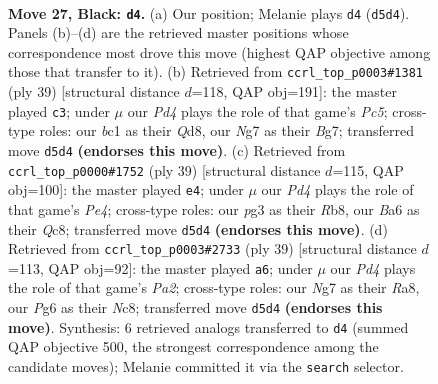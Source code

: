 \documentclass[11pt]{article}
\begin{document}
\begin{figure}[p]
\label{fig:thought-m51}
\end{figure}

\clearpage

\begin{figure}[p]\centering
\begin{subfigure}{0.46\textwidth}\centering
\resizebox{\linewidth}{!}{%
\newchessgame
\chessboard[
  setfen={1r1q2k1/p1n2rn1/b4bpp/2pp1p2/P4P2/1P2N1P1/Q3P1BP/1RBRN1K1 b - - 11 27},
  showmover=false,
  pgfstyle=straightmove, color=movearrow, markmove={d5-d4}
]}
\caption{}
\end{subfigure}\hfill
\begin{subfigure}{0.46\textwidth}\centering
\resizebox{\linewidth}{!}{%
\newchessgame
\chessboard[
  setfen={2bqr1k1/5pb1/1n1p1npp/3P4/1pp1PB2/7P/NP1N1PP1/3QRBK1 b - - 3 20},
  showmover=false,
  pgfstyle=straightmove, color=movearrow, markmove={c4-c3}
]}
\caption{}
\end{subfigure}
\\[4pt]
\begin{subfigure}{0.46\textwidth}\centering
\resizebox{\linewidth}{!}{%
\newchessgame
\chessboard[
  setfen={1rq1r1k1/1bpn1pp1/5b1p/p2Pp3/P1P4P/5NP1/R2BQPB1/3R2K1 b - - 0 20},
  showmover=false,
  pgfstyle=straightmove, color=movearrow, markmove={e5-e4}
]}
\caption{}
\end{subfigure}\hfill
\begin{subfigure}{0.46\textwidth}\centering
\resizebox{\linewidth}{!}{%
\newchessgame
\chessboard[
  setfen={r1nqr1k1/pp1n1ppp/3p1b2/PN1P4/5P2/R2B4/1P3P1P/2BQ2RK b - - 12 20},
  showmover=false,
  pgfstyle=straightmove, color=movearrow, markmove={a7-a6}
]}
\caption{}
\end{subfigure}
\caption{\textbf{Move 27, Black: \texttt{d4}.} (a) Our position; Melanie plays \texttt{d4} (\texttt{d5d4}). Panels (b)--(d) are the retrieved master positions whose correspondence most drove this move (highest QAP objective among those that transfer to it). (b) Retrieved from \texttt{ccrl\_top\_p0003\#1381} (ply 39) [structural distance $d$=118, QAP obj=191]: the master played \texttt{c3}; under $\mu$ our \emph{Pd4} plays the role of that game's \emph{Pc5}; cross-type roles: our \emph{b}c1 as their \emph{Q}d8, our \emph{N}g7 as their \emph{B}g7; transferred move \texttt{d5d4} \textbf{(endorses this move)}. (c) Retrieved from \texttt{ccrl\_top\_p0000\#1752} (ply 39) [structural distance $d$=115, QAP obj=100]: the master played \texttt{e4}; under $\mu$ our \emph{Pd4} plays the role of that game's \emph{Pe4}; cross-type roles: our \emph{p}g3 as their \emph{R}b8, our \emph{B}a6 as their \emph{Q}c8; transferred move \texttt{d5d4} \textbf{(endorses this move)}. (d) Retrieved from \texttt{ccrl\_top\_p0003\#2733} (ply 39) [structural distance $d$=113, QAP obj=92]: the master played \texttt{a6}; under $\mu$ our \emph{Pd4} plays the role of that game's \emph{Pa2}; cross-type roles: our \emph{N}g7 as their \emph{R}a8, our \emph{P}g6 as their \emph{N}c8; transferred move \texttt{d5d4} \textbf{(endorses this move)}. Synthesis: 6 retrieved analogs transferred to \texttt{d4} (summed QAP objective 500, the strongest correspondence among the candidate moves); Melanie committed it via the \texttt{search} selector.}

\end{figure}
\end{document}
